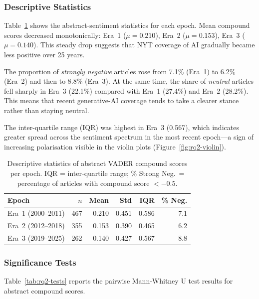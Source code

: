\subsubsection{Descriptive Statistics}

Table~\ref{tab:rq2-desc} shows the abstract-sentiment statistics for each
epoch. Mean compound scores decreased monotonically: Era~1 ($\mu = 0.210$),
Era~2 ($\mu = 0.153$), Era~3 ($\mu = 0.140$). This steady drop suggests
that NYT coverage of AI gradually became less positive over 25 years.

The proportion of \textit{strongly negative} articles rose from 7.1\%
(Era~1) to 6.2\% (Era~2) and then to 8.8\% (Era~3). At the same time, the
share of \textit{neutral} articles fell sharply in Era~3 (22.1\%) compared
with Era~1 (27.4\%) and Era~2 (28.2\%). This means that recent generative-AI
coverage tends to take a clearer stance rather than staying neutral.

The inter-quartile range (IQR) was highest in Era~3 (0.567), which indicates
greater spread across the sentiment spectrum in the most recent epoch---a
sign of increasing polarisation visible in the violin plots
(Figure~\ref{fig:rq2-violin}).

\begin{table}[t]
  \caption{Descriptive statistics of abstract VADER compound scores per
    epoch. IQR = inter-quartile range; \% Strong Neg.\ = percentage of
    articles with compound score $< -0.5$.}
  \label{tab:rq2-desc}
  \small
  \begin{tabular}{lrrrrr}
    \toprule
    Epoch            & $n$   & Mean   & Std    & IQR    & \% Neg. \\
    \midrule
    Era~1 (2000--2011) & 467 & 0.210  & 0.451  & 0.586  & 7.1 \\
    Era~2 (2012--2018) & 355 & 0.153  & 0.390  & 0.465  & 6.2 \\
    Era~3 (2019--2025) & 262 & 0.140  & 0.427  & 0.567  & 8.8 \\
    \bottomrule
  \end{tabular}
\end{table}

\subsubsection{Significance Tests}

Table~\ref{tab:rq2-tests} reports the pairwise Mann-Whitney U test results
for abstract compound scores.

